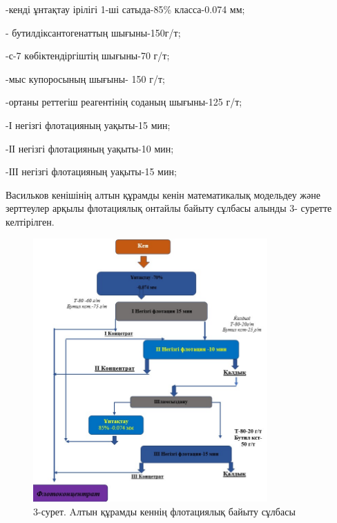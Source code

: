 \begin{multicols}{2}
-кенді ұнтақтау ірілігі 1-ші сатыда-85\% класса-0.074 мм;

- бутилдіксантогенаттың шығыны-150г/т;

-с-7 көбіктендіргіштің шығыны-70 г/т;

-мыс купоросының шығыны- 150 г/т;

-ортаны реттегіш реагентінің соданың шығыны-125 г/т;

-І негізгі флотацияның уақыты-15 мин;

-ІІ негізгі флотацияның уақыты-10 мин;

-ІІІ негізгі флотацияның уақыты-15 мин;

Васильков кенішінің алтын құрамды кенін математикалық модельдеу және
зерттеулер арқылы флотациялық онтайлы байыту сұлбасы алынды 3- суретте
келтірілген.
\end{multicols}

\begin{figure}[H]
	\centering
	\includegraphics[width=0.8\textwidth]{media/gor/image5}
	\caption*{3-сурет. Aлтын құрамды кеннің флотациялық байыту сұлбасы}
\end{figure}


